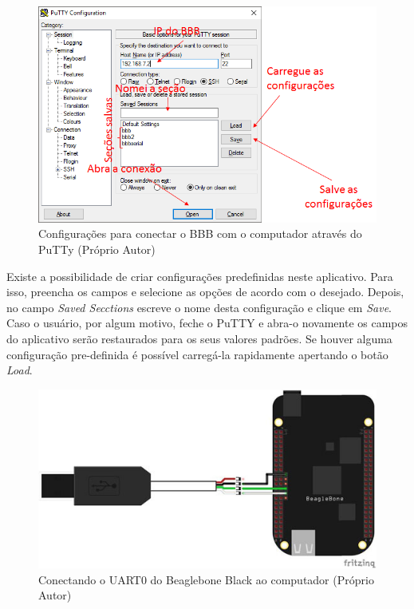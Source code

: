 \begin{figure}[h]
	\centering
	\includegraphics[width=\textwidth]{figuras/putty_interface.png}
	\caption{Configurações para conectar o BBB com o computador através do PuTTy (Próprio Autor)}
	\label{figura:putty_interface}
\end{figure}

Existe a possibilidade de criar configurações predefinidas neste aplicativo. Para isso, preencha os campos e selecione as opções de acordo com o desejado. Depois, no campo \emph{Saved Secctions} escreve o nome desta configuração e clique em \emph{Save}. Caso o usuário, por algum motivo, feche o PuTTY e abra-o novamente os campos do aplicativo serão restaurados para os seus valores padrões. Se houver alguma configuração pre-definida é possível carregá-la rapidamente apertando o botão \emph{Load}.

\begin{figure}[h]
	\centering
	\includegraphics[width=\textwidth]{figuras/bbb_ttl.jpg}
	\caption{Conectando o UART0 do Beaglebone Black ao computador (Próprio Autor)}
	\label{figura:bbb_ttl}
\end{figure}

